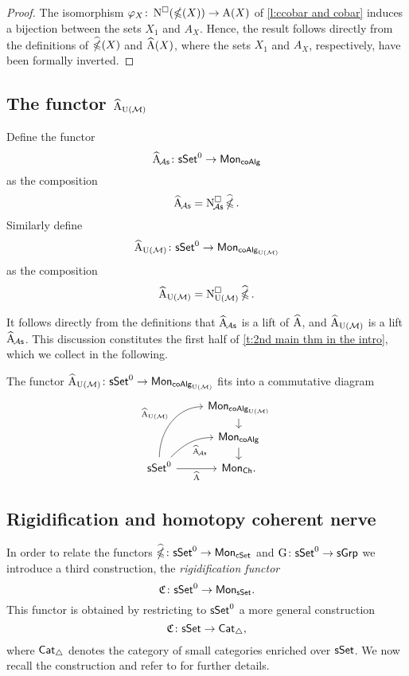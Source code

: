 \begin{proof}
	The isomorphism $\varphi_X \colon \cchains(\ccobar(X))\to \adams(X)$
	of \cref{l:ccobar and cobar} induces a bijection between the sets
	$X_1$ and $A_X$.
	Hence, the result follows directly from the definitions of $\ccobarE(X)$ and $\adamsE(X)$, where the sets $X_1$ and $A_X$, respectively, have been formally inverted.
\end{proof}

\subsection{The functor $\adamsE_{\UM}$} \label{s:ahatum}

Define the functor
\[
\adamsEA \colon \sSet^0 \to \Mon_{\coAlg}
\]
as the composition
\[
\adamsEA = \cchainsA \ccobarE.
\]
Similarly define
\[
\adamsE_{\UM} \colon \sSet^0 \to \Mon_{\coAlg_{\UM}}
\]
as the composition
\[
\adamsE_{\UM} = \cchainsUM \ccobarE.
\]

It follows directly from the definitions that $\adamsEA$ is a lift of $\adamsE$, and $\adamsE_{\UM}$ is a lift $\adamsEA$.
This discussion constitutes the first half of \cref{t:2nd main thm in the intro}, which we collect in the following.

\begin{lemma} \label{l:AhatUM}
The functor $\adamsEUM \colon \sSet^0 \to \Mon_{\coAlg_\UM}$ fits into a commutative diagram
	\[
	\begin{tikzcd}[row sep=small]
	& \Mon_{\coAlg_\UM} \arrow[d] \\
	& \Mon_{\coAlg} \arrow[d] \\
	\sSet^0
	\arrow[r, "\adamsE"', ]
	\arrow[ru, "\adamsEA"', out=45, in=180]
	\arrow[ruu, "\adamsEUM", out=90, in=180]
	& \Mon_{\Ch}.
	\end{tikzcd}
	\]
\end{lemma}

\subsection{Rigidification and homotopy coherent nerve}\label{ss:rigidification}

In order to relate the functors $\ccobarE \colon \sSet^0 \to \Mon_{\cSet}$ and $\kan \colon \sSet^0\to \sGrp$ we introduce a third construction, the \textit{rigidification functor}
\[
\rigid \colon \sSet^0 \to \Mon_{\sSet}.
\]
This functor is obtained by restricting to $\sSet^0$ a more general construction
\[
\rigid \colon \sSet \to \Cat_{\simplex},
\]
where $\Cat_{\simplex}$ denotes the category of small categories enriched over $\sSet$.
We now recall the construction and refer to \cite{dugger2011rigidification} for further details.

